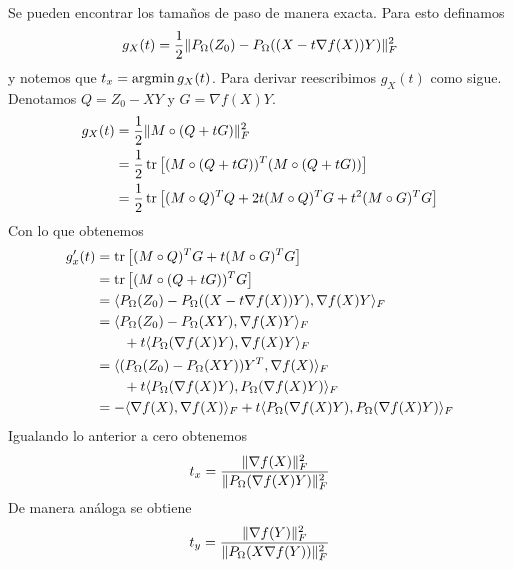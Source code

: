 Se pueden encontrar los tamaños de paso de manera exacta. Para esto definamos
\begin{equation*}
    g_X(t) = \frac{1}{2} \lVert P_{\Omega}(Z_0) - P_{\Omega}((X - t \nabla f(X)) Y)\rVert_F^2
\end{equation*}
y notemos que $t_x = \mathop{\mathrm{argmin}}\limits g_X(t)$. Para derivar reescribimos $g_X(t)$ como sigue. Denotamos $Q = Z_0 - XY$ y $G = \nabla f(X) Y$.
\begin{align*}
    g_X(t) &= \frac{1}{2} \lVert M \circ (Q + tG)\rVert_F^2 \\
           &= \frac{1}{2} \operatorname{tr}\left[ (M \circ (Q + tG))^T(M \circ (Q + tG)) \right]\\
           &= \frac{1}{2} \operatorname{tr}\left[ (M \circ Q)^TQ + 2t(M\circ Q)^T G + t^2 (M\circ G)^T G \right]
\end{align*}
Con lo que obtenemos
\begin{align*}
    g_x'(t) &= \operatorname{tr}\left[ (M \circ Q)^T G + t (M\circ G)^T G \right] \\
            &= \operatorname{tr}\left[ (M\circ ( Q + tG ))^T G \right]\\
            &= \langle P_{\Omega}(Z_0) - P_{\Omega}((X - t\nabla f(X))Y), \nabla f(X) Y\rangle_F \\
            &= \langle P_{\Omega}(Z_0) - P_{\Omega}(XY), \nabla f(X)Y\rangle_F  \\
            &\qquad + t\langle P_{\Omega}(\nabla f(X)Y), \nabla f(X) Y\rangle_F \\
            &= \langle(P_{\Omega}(Z_0) - P_{\Omega}(XY))Y^T, \nabla f(X)\rangle_F  \\
            &\qquad + t\langle P_{\Omega}(\nabla f(X)Y), P_{\Omega}(\nabla f(X) Y)\rangle_F \\
            &=- \langle\nabla f(X), \nabla f(X)\rangle_F + t\langle P_{\Omega}(\nabla f(X)Y), P_{\Omega}(\nabla f(X) Y)\rangle_F
\end{align*}
Igualando lo anterior a cero obtenemos
\begin{equation*}
    t_x = \frac{\lVert\nabla f(X)\rVert_F^2}{\lVert P_{\Omega}(\nabla f(X) Y)\rVert_F^2}
\end{equation*}
De manera análoga se obtiene
\begin{equation*}
    t_y = \frac{\lVert\nabla f(Y)\rVert_F^2}{\lVert P_{\Omega}(X\nabla f(Y))\rVert_F^2}
\end{equation*}


